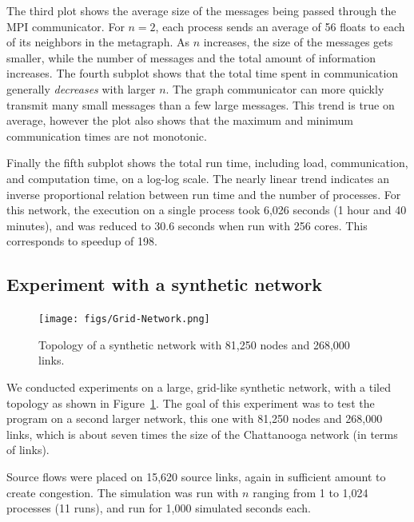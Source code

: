 The third plot shows the average size of the messages being passed through the MPI communicator. For $n=2$, each process sends an average of 56 floats to each of its neighbors in the metagraph. As $n$ increases, the size of the messages gets smaller, while the number of messages and the total amount of information increases. The fourth subplot shows that the total time spent in communication generally \textit{decreases} with larger $n$. The graph communicator can more quickly transmit many small messages than a few large messages. This trend is true on average, however the plot also shows that the maximum and minimum communication times are not monotonic. 

Finally the fifth subplot shows the total run time, including load, communication, and computation time, on a log-log scale. The nearly linear trend indicates an inverse proportional relation between run time and the number of processes.  For this network, the execution on a single process took 6,026 seconds (1 hour and 40 minutes), and was reduced to 30.6 seconds when run with 256 cores. This corresponds to speedup  of 198.
 
\subsection{Experiment with a synthetic network}
\begin{figure}[!ht]
    \centering
    \texttt{[image: figs/Grid-Network.png]}
    \caption{Topology of a synthetic network with 81,250 nodes and 268,000 links.}
    \label{fig:Synthetic_Network}
\end{figure}

We conducted experiments on a large, grid-like synthetic network, with a tiled topology as shown in Figure~\ref{fig:Synthetic_Network}. The goal of this experiment was to test the program on a second larger network, this one with 81,250 nodes and 268,000 links, which is about seven times the size of the Chattanooga network (in terms of links). 

Source flows were placed on 15,620 source links, again in sufficient amount to create congestion. The simulation was run with $n$ ranging from 1 to 1,024 processes (11 runs), and run for 1,000 simulated seconds each. 

